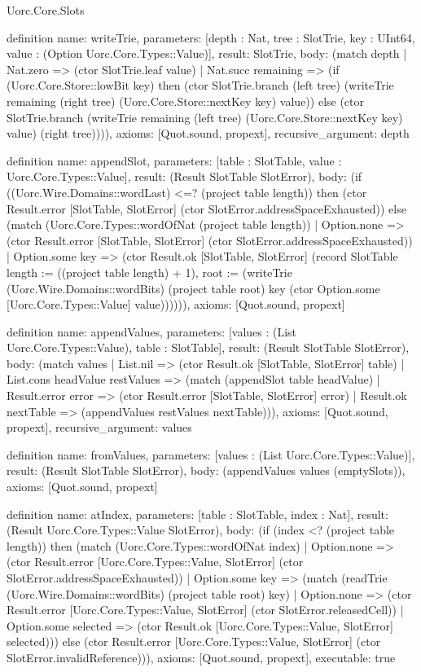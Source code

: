 \begin{lexlean}{Uorc.Core.Slots}
\begin{semanticmodule}
definition{
  name: writeTrie,
  parameters: [depth : Nat, tree : SlotTrie, key : UInt64, value : (Option Uorc.Core.Types::Value)],
  result: SlotTrie,
  body: (match depth
    | Nat.zero => (ctor SlotTrie.leaf value)
    | Nat.succ remaining => (if (Uorc.Core.Store::lowBit key) then (ctor SlotTrie.branch (left tree) (writeTrie remaining (right tree) (Uorc.Core.Store::nextKey key) value)) else (ctor SlotTrie.branch (writeTrie remaining (left tree) (Uorc.Core.Store::nextKey key) value) (right tree)))),
  axioms: [Quot.sound, propext],
  recursive_argument: depth
}

definition{
  name: appendSlot,
  parameters: [table : SlotTable, value : Uorc.Core.Types::Value],
  result: (Result SlotTable SlotError),
  body: (if ((Uorc.Wire.Domains::wordLast) <=? (project table length)) then (ctor Result.error [SlotTable, SlotError] (ctor SlotError.addressSpaceExhausted)) else (match (Uorc.Core.Types::wordOfNat (project table length))
    | Option.none => (ctor Result.error [SlotTable, SlotError] (ctor SlotError.addressSpaceExhausted))
    | Option.some key => (ctor Result.ok [SlotTable, SlotError] (record SlotTable {length := ((project table length) + 1), root := (writeTrie (Uorc.Wire.Domains::wordBits) (project table root) key (ctor Option.some [Uorc.Core.Types::Value] value))})))),
  axioms: [Quot.sound, propext]
}

definition{
  name: appendValues,
  parameters: [values : (List Uorc.Core.Types::Value), table : SlotTable],
  result: (Result SlotTable SlotError),
  body: (match values
    | List.nil => (ctor Result.ok [SlotTable, SlotError] table)
    | List.cons headValue restValues => (match (appendSlot table headValue)
      | Result.error error => (ctor Result.error [SlotTable, SlotError] error)
      | Result.ok nextTable => (appendValues restValues nextTable))),
  axioms: [Quot.sound, propext],
  recursive_argument: values
}

definition{
  name: fromValues,
  parameters: [values : (List Uorc.Core.Types::Value)],
  result: (Result SlotTable SlotError),
  body: (appendValues values (emptySlots)),
  axioms: [Quot.sound, propext]
}

definition{
  name: atIndex,
  parameters: [table : SlotTable, index : Nat],
  result: (Result Uorc.Core.Types::Value SlotError),
  body: (if (index <? (project table length)) then (match (Uorc.Core.Types::wordOfNat index)
    | Option.none => (ctor Result.error [Uorc.Core.Types::Value, SlotError] (ctor SlotError.addressSpaceExhausted))
    | Option.some key => (match (readTrie (Uorc.Wire.Domains::wordBits) (project table root) key)
      | Option.none => (ctor Result.error [Uorc.Core.Types::Value, SlotError] (ctor SlotError.releasedCell))
      | Option.some selected => (ctor Result.ok [Uorc.Core.Types::Value, SlotError] selected))) else (ctor Result.error [Uorc.Core.Types::Value, SlotError] (ctor SlotError.invalidReference))),
  axioms: [Quot.sound, propext],
  executable: true
}


\end{semanticmodule}
\end{lexlean}
